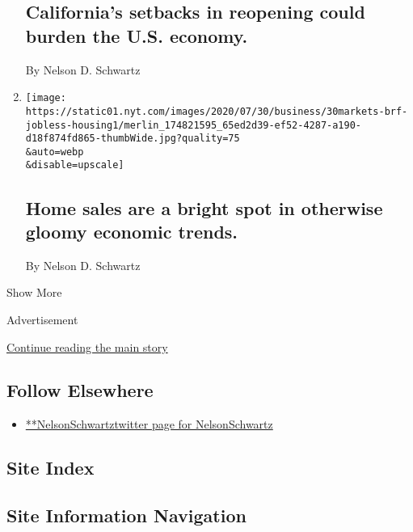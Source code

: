 \begin{enumerate}
  \hypertarget{californias-setbacks-in-reopening-could-burden-the-us-economy}{%
  \subsection{California's setbacks in reopening could burden the U.S.
  economy.}\label{californias-setbacks-in-reopening-could-burden-the-us-economy}}

  By Nelson D. Schwartz
\item
  \href{/2020/07/30/business/home-sales-are-a-bright-spot-in-otherwise-gloomy-economic-trends.html}{}

  \texttt{[image: https://static01.nyt.com/images/2020/07/30/business/30markets-brf-jobless-housing1/merlin\_174821595\_65ed2d39-ef52-4287-a190-d18f874fd865-thumbWide.jpg?quality=75\\\&auto=webp\\\&disable=upscale]}

  \hypertarget{home-sales-are-a-bright-spot-in-otherwise-gloomy-economic-trends}{%
  \subsection{Home sales are a bright spot in otherwise gloomy economic
  trends.}\label{home-sales-are-a-bright-spot-in-otherwise-gloomy-economic-trends}}

  By Nelson D. Schwartz
\end{enumerate}

Show More

Advertisement

\protect\hyperlink{after-mid2}{Continue reading the main story}

\hypertarget{follow-elsewhere}{%
\subsection{Follow Elsewhere}\label{follow-elsewhere}}

\begin{itemize}
\tightlist
\item
  \href{https://twitter.com/NelsonSchwartz}{**NelsonSchwartztwitter page
  for NelsonSchwartz}
\end{itemize}

\hypertarget{site-index}{%
\subsection{Site Index}\label{site-index}}

\hypertarget{site-information-navigation}{%
\subsection{Site Information
Navigation}\label{site-information-navigation}}

